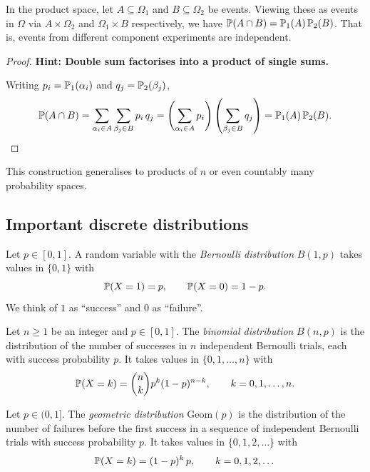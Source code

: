 \documentclass[a4paper]{article}
\begin{document}
\begin{prop}
  In the product space, let $A\subseteq \Omega_1$ and $B\subseteq \Omega_2$ be events. Viewing these as events in $\Omega$ via $A \times \Omega_2$ and $\Omega_1 \times B$ respectively, we have $\P(A\cap B) = \P_1(A)\,\P_2(B)$. That is, events from different component experiments are independent.
\end{prop}

\begin{proof}
  \textbf{Hint: Double sum factorises into a product of single sums.}

  Writing $p_i = \P_1(\alpha_i)$ and $q_j = \P_2(\beta_j)$,
  \[
    \P(A\cap B) = \sum_{\alpha_i\in A}\sum_{\beta_j\in B} p_i\, q_j = \left(\sum_{\alpha_i\in A} p_i\right)\left(\sum_{\beta_j\in B}q_j\right) = \P_1(A)\,\P_2(B).\qedhere
  \]
\end{proof}

\begin{remark}
  This construction generalises to products of $n$ or even countably many probability spaces.
\end{remark}


\subsection{Important discrete distributions}

\begin{defi}
  Let $p\in [0, 1]$. A random variable with the \emph{Bernoulli distribution} $B(1, p)$ takes values in $\{0, 1\}$ with
  \[
    \P(X = 1) = p, \qquad \P(X = 0) = 1- p.
  \]
  We think of $1$ as ``success'' and $0$ as ``failure''.
\end{defi}

\begin{defi}
  Let $n \geq 1$ be an integer and $p \in [0,1]$. The \emph{binomial distribution} $B(n, p)$ is the distribution of the number of successes in $n$ independent Bernoulli trials, each with success probability $p$. It takes values in $\{0, 1, \dotsc, n\}$ with
  \[
    \P(X = k) = \binom{n}{k}p^k(1 - p)^{n - k}, \qquad k = 0, 1, \dotsc, n.
  \]
\end{defi}

\begin{defi}
  Let $p \in (0, 1]$. The \emph{geometric distribution} $\mathrm{Geom}(p)$ is the distribution of the number of failures before the first success in a sequence of independent Bernoulli trials with success probability $p$. It takes values in $\{0, 1, 2, \dotsc\}$ with
  \[
    \P(X = k) = (1- p)^k\, p, \qquad k = 0, 1, 2, \dotsc
  \]
\end{defi}
\end{document}
